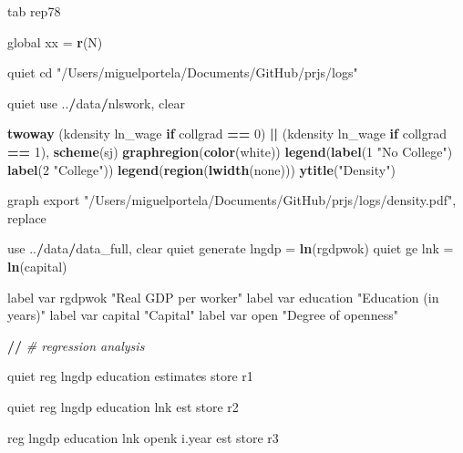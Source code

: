 \documentclass[
  12pt,
]{article}
\newenvironment{Shaded}{\begin{snugshade}}{\end{snugshade}}
\newcommand{\CommentTok}[1]{\textcolor[rgb]{0.56,0.35,0.01}{\textit{#1}}}
\newcommand{\ControlFlowTok}[1]{\textcolor[rgb]{0.13,0.29,0.53}{\textbf{#1}}}
\newcommand{\DecValTok}[1]{\textcolor[rgb]{0.00,0.00,0.81}{#1}}
\newcommand{\ErrorTok}[1]{\textcolor[rgb]{0.64,0.00,0.00}{\textbf{#1}}}
\newcommand{\KeywordTok}[1]{\textcolor[rgb]{0.13,0.29,0.53}{\textbf{#1}}}
\newcommand{\NormalTok}[1]{#1}
\newcommand{\OperatorTok}[1]{\textcolor[rgb]{0.81,0.36,0.00}{\textbf{#1}}}
\newcommand{\StringTok}[1]{\textcolor[rgb]{0.31,0.60,0.02}{#1}}
\begin{document}
\begin{Shaded}
\begin{Highlighting}[]
{\NormalTok{tab rep78}

\NormalTok{global xx =}\StringTok{ }\KeywordTok{r}\NormalTok{(N)}

\NormalTok{quiet cd }\StringTok{"/Users/miguelportela/Documents/GitHub/prjs/logs"}

\NormalTok{quiet use ..}\OperatorTok{/}\NormalTok{data}\OperatorTok{/}\NormalTok{nlswork, clear}

\KeywordTok{twoway}\NormalTok{ (kdensity ln_wage }\ControlFlowTok{if}\NormalTok{ collgrad }\OperatorTok{==}\StringTok{ }\DecValTok{0}\NormalTok{) }\OperatorTok{||}\StringTok{ }\NormalTok{(kdensity ln_wage }\ControlFlowTok{if}\NormalTok{ collgrad }\OperatorTok{==}\StringTok{ }\DecValTok{1}\NormalTok{), }\KeywordTok{scheme}\NormalTok{(sj) }\KeywordTok{graphregion}\NormalTok{(}\KeywordTok{color}\NormalTok{(white)) }\KeywordTok{legend}\NormalTok{(}\KeywordTok{label}\NormalTok{(}\DecValTok{1} \StringTok{"No College"}\NormalTok{) }\KeywordTok{label}\NormalTok{(}\DecValTok{2} \StringTok{"College"}\NormalTok{)) }\KeywordTok{legend}\NormalTok{(}\KeywordTok{region}\NormalTok{(}\KeywordTok{lwidth}\NormalTok{(none))) }\KeywordTok{ytitle}\NormalTok{(}\StringTok{"Density"}\NormalTok{)}

\NormalTok{graph export }\StringTok{"/Users/miguelportela/Documents/GitHub/prjs/logs/density.pdf"}\NormalTok{, replace}

\NormalTok{use ..}\OperatorTok{/}\NormalTok{data}\OperatorTok{/}\NormalTok{data_full, clear}
\NormalTok{        quiet generate lngdp =}\StringTok{ }\KeywordTok{ln}\NormalTok{(rgdpwok)}
\NormalTok{        quiet ge lnk =}\StringTok{ }\KeywordTok{ln}\NormalTok{(capital)}

\NormalTok{        label var rgdpwok }\StringTok{"Real GDP per worker"}
\NormalTok{        label var education }\StringTok{"Education (in years)"}
\NormalTok{        label var capital }\StringTok{"Capital"}
\NormalTok{        label var open }\StringTok{"Degree of openness"}

\OperatorTok{/}\ErrorTok{/}\StringTok{ }\CommentTok{# regression analysis}

\StringTok{    }\NormalTok{quiet reg lngdp education}
\NormalTok{        estimates store r1}

\NormalTok{    quiet reg lngdp education lnk}
\NormalTok{        est store r2}

\NormalTok{    reg lngdp education lnk openk i.year}
\NormalTok{        est store r3}

}
\end{Highlighting}
\end{Shaded}
\end{document}
